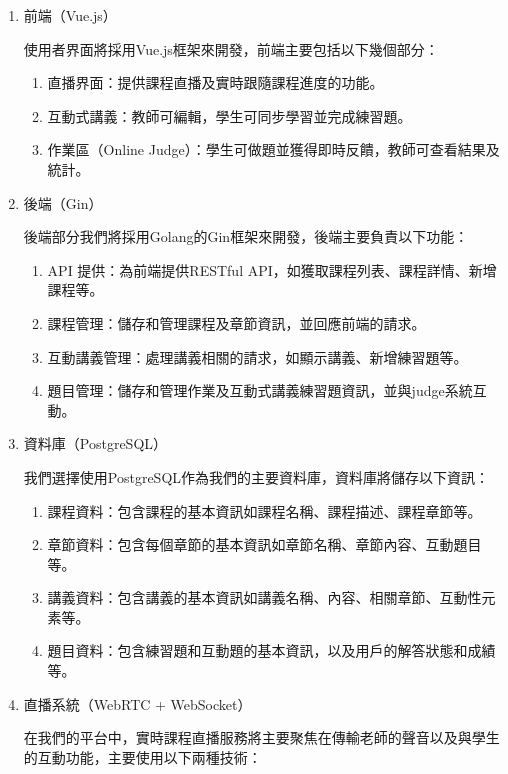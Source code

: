 \documentclass[12pt]{article}
\begin{document}
\begin{enumerate}[label=(\arabic*)]
  \setlength{\parindent}{2em}
  \item 前端（Vue.js）
  \par 使用者界面將採用Vue.js框架來開發，前端主要包括以下幾個部分：

  \begin{enumerate}[label=\textbullet, noitemsep]
    \item 直播界面：提供課程直播及實時跟隨課程進度的功能。
    \item 互動式講義：教師可編輯，學生可同步學習並完成練習題。
    \item 作業區（Online Judge）：學生可做題並獲得即時反饋，教師可查看結果及統計。
  \end{enumerate}

  \item 後端（Gin）
  \par 後端部分我們將採用Golang的Gin框架來開發，後端主要負責以下功能：

  \begin{enumerate}[label=\textbullet, noitemsep]
    \item API 提供：為前端提供RESTful API，如獲取課程列表、課程詳情、新增課程等。
    \item 課程管理：儲存和管理課程及章節資訊，並回應前端的請求。
    \item 互動講義管理：處理講義相關的請求，如顯示講義、新增練習題等。
    \item 題目管理：儲存和管理作業及互動式講義練習題資訊，並與judge系統互動。
  \end{enumerate}

  \item 資料庫（PostgreSQL）
  \par 我們選擇使用PostgreSQL作為我們的主要資料庫，資料庫將儲存以下資訊：

  \begin{enumerate}[label=\textbullet, noitemsep]
    \item 課程資料：包含課程的基本資訊如課程名稱、課程描述、課程章節等。
    \item 章節資料：包含每個章節的基本資訊如章節名稱、章節內容、互動題目等。
    \item 講義資料：包含講義的基本資訊如講義名稱、內容、相關章節、互動性元素等。
    \item 題目資料：包含練習題和互動題的基本資訊，以及用戶的解答狀態和成績等。
  \end{enumerate}

  \item 直播系統（WebRTC + WebSocket）
  \par 在我們的平台中，實時課程直播服務將主要聚焦在傳輸老師的聲音以及與學生的互動功能，主要使用以下兩種技術：


\end{enumerate}
\end{document}
